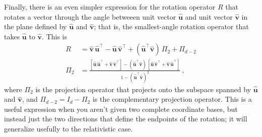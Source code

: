\documentclass{article}
\newcommand{\proj}{\mathsf{\Pi}}
\newcommand{\Ehat}[1]{{\mathbf{\hat{#1}}}} %
\begin{document}
Finally, there is an even simpler expression for the rotation operator $R$ that rotates a vector through the angle betweeen unit vector $\Ehat{u}$ and unit vector $\Ehat{v}$ in the plane defined by $\Ehat{u}$ and $\Ehat{v}$; that is, the smallest-angle rotation operator that takes $\Ehat{u}$ to $\Ehat{v}$.
This is
\begin{align}
    R &= \Ehat{v}\,\Ehat{u}^\top - \Ehat{u}\,\Ehat{v}^\top + (\Ehat{u}^\top\Ehat{v})\,\proj_{2} + \proj_{d-2} \label{eq:vecs2rot} \\
    \proj_2 &= \frac{[\Ehat{u}\,\Ehat{u}^\top + \Ehat{v}\,\Ehat{v}^\top] - (\Ehat{u}^\top\Ehat{v})\,[\Ehat{u}\,\Ehat{v}^\top + \Ehat{v}\,\Ehat{u}^\top]}{1 - (\Ehat{u}^\top\Ehat{v})^2} ~,
\end{align}
where $\proj_2$ is the projection operator that projects onto the subspace spanned by $\Ehat{u}$ and $\Ehat{v}$, and $\proj_{d-2} = I_d - \proj_2$ is the complementary projection operator.
This is a useful expression when you aren't given two complete coordinate bases, but instead just the two directions that define the endpoints of the rotation; it will generalize usefully to the relativistic case.
\end{document}
